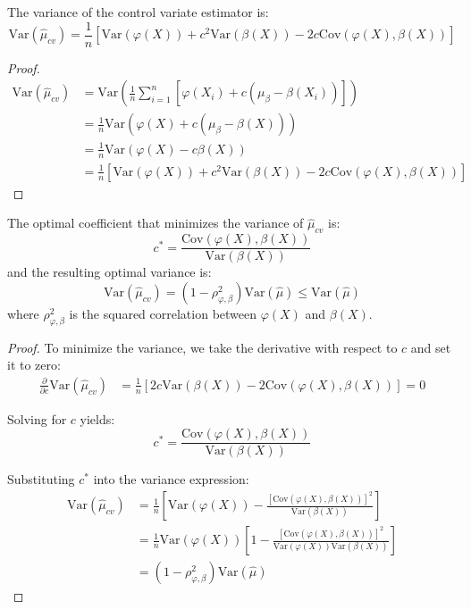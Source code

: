 \begin{theoremrep}
The variance of the control variate estimator is:
\begin{equation}
\text{Var}(\hat{\mu}_{cv}) = \frac{1}{n}[\text{Var}(\varphi(X)) + c^2\text{Var}(\beta(X)) - 2c\text{Cov}(\varphi(X), \beta(X))]
\end{equation}
\end{theoremrep}

\begin{proof}
\begin{align*}
\text{Var}(\hat{\mu}_{cv}) &= \text{Var}\left(\frac{1}{n}\sum_{i=1}^n [\varphi(X_i) + c(\mu_\beta - \beta(X_i))]\right)\\
&= \frac{1}{n}\text{Var}(\varphi(X) + c(\mu_\beta - \beta(X)))\\
&= \frac{1}{n}\text{Var}(\varphi(X) - c\beta(X))\\
&= \frac{1}{n}[\text{Var}(\varphi(X)) + c^2\text{Var}(\beta(X)) - 2c\text{Cov}(\varphi(X), \beta(X))]
\end{align*}
\end{proof}

\begin{theoremrep}
The optimal coefficient that minimizes the variance of $\hat{\mu}_{cv}$ is:
\begin{equation}
c^* = \frac{\text{Cov}(\varphi(X), \beta(X))}{\text{Var}(\beta(X))}
\end{equation}
and the resulting optimal variance is:
\begin{equation}
\text{Var}(\hat{\mu}_{cv}) = (1 - \rho_{\varphi,\beta}^2)\text{Var}(\hat{\mu}) \leq \text{Var}(\hat{\mu})
\end{equation}
where $\rho_{\varphi,\beta}^2$ is the squared correlation between $\varphi(X)$ and $\beta(X)$.
\end{theoremrep}

\begin{proof}
To minimize the variance, we take the derivative with respect to $c$ and set it to zero:
\begin{align*}
\frac{\partial}{\partial c}\text{Var}(\hat{\mu}_{cv}) &= \frac{1}{n}[2c\text{Var}(\beta(X)) - 2\text{Cov}(\varphi(X), \beta(X))] = 0
\end{align*}

Solving for $c$ yields:
$$c^* = \frac{\text{Cov}(\varphi(X), \beta(X))}{\text{Var}(\beta(X))}$$

Substituting $c^*$ into the variance expression:
\begin{align*}
\text{Var}(\hat{\mu}_{cv}) &= \frac{1}{n}\left[\text{Var}(\varphi(X)) - \frac{[\text{Cov}(\varphi(X), \beta(X))]^2}{\text{Var}(\beta(X))}\right]\\
&= \frac{1}{n}\text{Var}(\varphi(X))\left[1 - \frac{[\text{Cov}(\varphi(X), \beta(X))]^2}{\text{Var}(\varphi(X))\text{Var}(\beta(X))}\right]\\
&= (1 - \rho_{\varphi,\beta}^2)\text{Var}(\hat{\mu})
\end{align*}
\end{proof}

